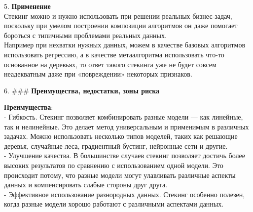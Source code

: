 5. \textbf{Применение}\\
Стекинг можно и нужно использовать при решении реальных бизнес-задач, поскольку при умелом построении композиции алгоритмов он даже помогает бороться с типичными проблемами реальных данных. \\
Например при нехватки нужных данных, можем в качестве базовых алгоритмов использовать регрессию, а в качестве метаалгоритма использовать что-то основанное на деревьях, то ответ такого стекинга уже не будет совсем неадекватным даже при «повреждении» некоторых признаков.

6. ### \textbf{Преимущества, недостатки, зоны риска}

\textbf{Преимущества}:\\
- Гибкость. Стекинг позволяет комбинировать разные модели — как линейные, так и нелинейные. Это делает метод универсальным и применимым в различных задачах. Можно использовать несколько типов моделей, таких как решающие деревья, случайные леса, градиентный бустинг, нейронные сети и другие.\\
- Улучшение качества. В большинстве случаев стекинг позволяет достичь более высоких результатов по сравнению с использованием одной модели. Это происходит потому, что разные модели могут улавливать различные аспекты данных и компенсировать слабые стороны друг друга.\\
- Эффективное использование разнородных данных. Стекинг особенно полезен, когда разные модели хорошо работают с различными аспектами данных. \\
  
